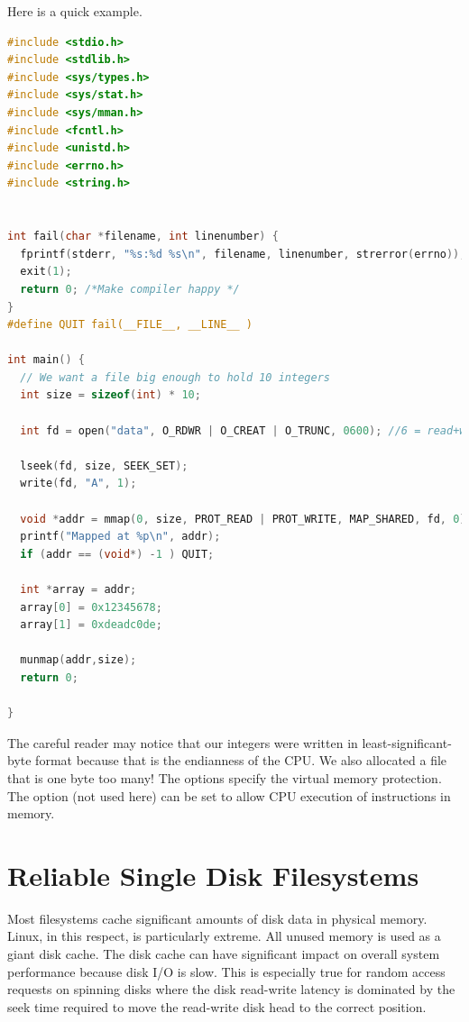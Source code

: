 Here is a quick example.

\begin{lstlisting}[language=C]
#include <stdio.h>
#include <stdlib.h>
#include <sys/types.h>
#include <sys/stat.h>
#include <sys/mman.h>
#include <fcntl.h>
#include <unistd.h>
#include <errno.h>
#include <string.h>


int fail(char *filename, int linenumber) {
  fprintf(stderr, "%s:%d %s\n", filename, linenumber, strerror(errno));
  exit(1);
  return 0; /*Make compiler happy */
}
#define QUIT fail(__FILE__, __LINE__ )

int main() {
  // We want a file big enough to hold 10 integers
  int size = sizeof(int) * 10;

  int fd = open("data", O_RDWR | O_CREAT | O_TRUNC, 0600); //6 = read+write for me!

  lseek(fd, size, SEEK_SET);
  write(fd, "A", 1);

  void *addr = mmap(0, size, PROT_READ | PROT_WRITE, MAP_SHARED, fd, 0);
  printf("Mapped at %p\n", addr);
  if (addr == (void*) -1 ) QUIT;

  int *array = addr;
  array[0] = 0x12345678;
  array[1] = 0xdeadc0de;

  munmap(addr,size);
  return 0;

}
\end{lstlisting}

The careful reader may notice that our integers were written in least-significant-byte format because that is the endianness of the CPU.
We also allocated a file that is one byte too many! The  options specify the virtual memory protection.
The option  (not used here) can be set to allow CPU execution of instructions in memory.

\section{Reliable Single Disk Filesystems}

Most filesystems cache significant amounts of disk data in physical memory.
Linux, in this respect, is particularly extreme.
All unused memory is used as a giant disk cache.
The disk cache can have significant impact on overall system performance because disk I/O is slow.
This is especially true for random access requests on spinning disks where the disk read-write latency is dominated by the seek time required to move the read-write disk head to the correct position.

